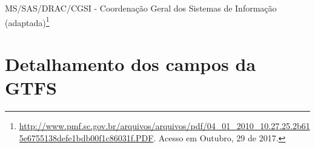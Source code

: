 \documentclass[
	12pt,				%
	oneside,			%
	a4paper,			%
	english,			%
	brazil				%
	]{abntex2ppgsi}
\begin{document}
\begin{apendicesenv}
\begin{longtable}{c|c}
\end{longtable}

 MS/SAS/DRAC/CGSI - Coordenação Geral dos Sistemas de Informação (adaptada)\footnote{\url{http://www.pmf.sc.gov.br/arquivos/arquivos/pdf/04_01_2010_10.27.25.2b615e6755138defe1bdb00f1c86031f.PDF}. Acesso em Outubro, 29 de 2017.}

\clearpage


%
%
%
\chapter{Detalhamento dos campos da GTFS}
\label{apendiceC}




\end{apendicesenv}
\end{document}
